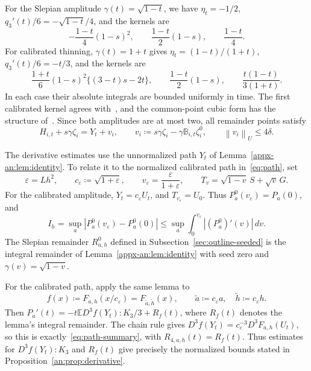 \documentclass[11pt,letterpaper]{article}
\theoremstyle{remark}
\newcommand{\E}{\mathbb E}
\newcommand{\norm}[1]{\left\lVert#1\right\rVert}
\begin{document}
For the Slepian amplitude \(\gamma(t)=\sqrt{1-t}\), we have
\(\eta_t=-1/2\), \(q_3'(t)/6=-\sqrt{1-t}/4\), and the kernels are
\[
 -\frac{1-t}{4}(1-s)^2,\qquad
 \frac{1-t}{2}(1-s),\qquad\frac{1-t}{4}.
\]
For calibrated thinning, \(\gamma(t)=1+t\) gives
\(\eta_t=(1-t)/(1+t)\), \(q_3'(t)/6=-t/3\), and the kernels are
\[
 \frac{1+t}{6}(1-s)^2\{(3-t)s-2t\},\qquad
 \frac{1-t}{2}(1-s),\qquad\frac{t(1-t)}{3(1+t)}.
\]
In each case their absolute integrals are bounded uniformly in time.
The first calibrated kernel agrees with~\cite[Lemma~4.1]{AL}, and
the common-point cubic form has the structure
of~\cite[Lemma~22]{GaoZhang}. Since both amplitudes are at most two,
all remainder points satisfy
\begin{equation}
 H_{i,t}+s\gamma\zeta_i=Y_t+v_i,\qquad
 v_i\coloneqq s\gamma\zeta_i-\gamma\mathbb B_{i,t}\zeta_i^0,
 \qquad \norm{v_i}_U\le4\delta.
 \label{appx-an:translates}
\end{equation}

The derivative estimates use the unnormalized path \(Y_t\) of
Lemma~\ref{appx-an:lem:identity}. To relate it to the normalized
calibrated path in~\eqref{eq:path}, set
\begin{equation}
 \varepsilon=Lh^2,\qquad
 c_\varepsilon\coloneqq\sqrt{1+\varepsilon},\qquad
 v_\varepsilon=\frac{\varepsilon}{1+\varepsilon},
 \qquad T_v=\sqrt{1-v}\,S+\sqrt v\,G.
 \label{eq:seed-initialization}
\end{equation}
For the calibrated amplitude, \(Y_t=c_\varepsilon U_t\), and
\(T_{v_\varepsilon}=U_0\). {Thus
\(P_a^0(v_\varepsilon)=P_a(0)\), and}
{
\[
 I_h=\sup_a|P_a^0(v_\varepsilon)-P_a^0(0)|
 \le\sup_a\int_0^{v_\varepsilon}|(P_a^0)'(v)|\,dv.
\]
}
The Slepian remainder \(R^0_{a,h}\) defined in
Subsection~\ref{sec:outline-seeded} is the integral remainder of
Lemma~\ref{appx-an:lem:identity} with seed zero and
\(\gamma(v)=\sqrt{1-v}\).

For the calibrated path, apply the same lemma to
\begin{equation}
 f(x)\coloneqq F_{a,h}(x/c_\varepsilon)
       =F_{\widetilde a,\widetilde h}(x),\qquad
 \widetilde a\coloneqq c_\varepsilon a,\quad
 \widetilde h\coloneqq c_\varepsilon h.
 \label{eq:seeded-test}
\end{equation}
Then \(P_a'(t)=-t\E D^3f(Y_t):K_3/3+R_f(t)\), where
\(R_f(t)\) denotes the lemma's integral remainder. The chain rule
gives \(D^3f(Y_t)=c_\varepsilon^{-3}D^3F_{a,h}(U_t)\), so this is
exactly~\eqref{eq:path-summary}, with \(R_{4,a,h}(t)=R_f(t)\).
Thus estimates for \(D^3f(Y_t):K_3\) and \(R_f(t)\) give precisely
the normalized bounds stated in Proposition~\ref{an:prop:derivative}.
\end{document}
